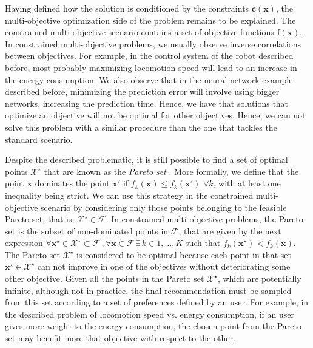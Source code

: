 Having defined how the solution is conditioned by the constraints $\mathbf{c}(\mathbf{x})$, the multi-objective optimization side of the problem remains to be explained. The constrained multi-objective scenario contains a set of objective functions $\mathbf{f}(\mathbf{x})$. In constrained multi-objective problems, we usually observe inverse correlations between objectives. For example, in the control system of the robot described before, most probably maximizing locomotion speed will lead to an increase in the energy consumption. We also observe that in the neural network example described before, minimizing the prediction error will involve using bigger networks, increasing the prediction time. Hence, we have that solutions that optimize an objective will not be optimal for other objectives. Hence, we can not solve this problem with a similar procedure than the one that tackles the standard scenario.

Despite the described problematic, it is still possible to find a set of optimal points $\mathcal{X}^{\star}$ that are known as the \textit{Pareto set} \citep{siarry2003multiobjective}. More formally, we define that the point $\mathbf{x}$
dominates the point $\mathbf{x}'$ if $f_k (\mathbf{x}) \leq f_k (\mathbf{x}')$ $\forall k$,
with at least one inequality being strict. We can use this strategy in the constrained multi-objective scenario by considering only those points belonging to the feasible Pareto set, that is, $\mathcal{X}^{\star} \in \mathcal{F}$. In constrained multi-objective problems, the Pareto set is the subset of
non-dominated points in $\mathcal{F}$, that are given by the next expression $\forall \mathbf{x}^{\star} \in \mathcal{X}^{\star} \subset \mathcal{F} \,, 
\forall \mathbf{x} \in \mathcal{F}\, \exists\, k \in {1,...,K}$ such that $f_k(\mathbf{x}^{\star}) < f_k(\mathbf{x})$.
The Pareto set $\mathcal{X}^{\star}$ is considered to be optimal because each point in that set $\mathbf{x}^{\star} \in \mathcal{X}^{\star}$ can not improve in one of the objectives without deteriorating some other objective. Given all the points in the Pareto set $\mathcal{X}^\star$, which are potentially infinite, although not in practice, the final recommendation must be sampled from this set according to a set of preferences defined by an user. For example, in the described problem of locomotion speed vs. energy consumption, if an user gives more weight to the energy consumption, the chosen point from the Pareto set may benefit more that objective with respect to the other.


